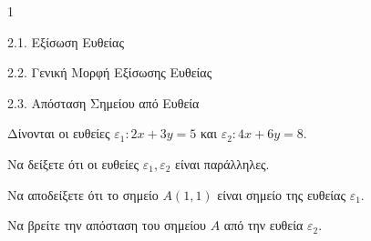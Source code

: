 \begin{ylh}{1}
    \item 2.1. Εξίσωση Ευθείας
    \item 2.2. Γενική Μορφή Εξίσωσης Ευθείας
    \item 2.3. Απόσταση Σημείου από Ευθεία
\end{ylh}
Δίνονται οι ευθείες $\varepsilon_1: 2x + 3y = 5$ και $\varepsilon_2: 4x + 6y = 8$.
\begin{alist}
    \item Να δείξετε ότι οι ευθείες $\varepsilon_1, \varepsilon_2$ είναι παράλληλες. 
    \item Να αποδείξετε ότι το σημείο $A(1,1)$ είναι σημείο της ευθείας $\varepsilon_1$. 
    \item Να βρείτε την απόσταση του σημείου $A$ από την ευθεία $\varepsilon_2$. 
\end{alist}